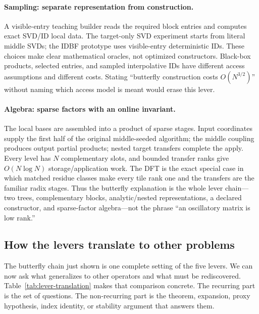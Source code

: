 \documentclass[11pt,a4paper]{article}
\begin{document}
\paragraph{Sampling: separate representation from construction.} A visible-entry teaching builder reads the required block entries and computes exact SVD/ID local data. The target-only SVD experiment starts from literal middle SVDs; the IDBF prototype uses visible-entry deterministic IDs. These choices make clear mathematical oracles, not optimized constructors. Black-box products, selected entries, and sampled interpolative IDs have different access assumptions and different costs. Stating ``butterfly construction costs $O(N^{3/2})$'' without naming which access model is meant would erase this lever.

\paragraph{Algebra: sparse factors with an online invariant.} The local bases are assembled into a product of sparse stages. Input coordinates supply the first half of the original middle-seeded algorithm; the middle coupling produces output partial products; nested target transfers complete the apply. Every level has $N$ complementary slots, and bounded transfer ranks give $O(N\log N)$ storage/application work. The DFT is the exact special case in which matched residue classes make every tile rank one and the transfers are the familiar radix stages. Thus the butterfly explanation is the whole lever chain---two trees, complementary blocks, analytic/nested representations, a declared constructor, and sparse-factor algebra---not the phrase ``an oscillatory matrix is low rank.''

\subsection{How the levers translate to other problems}
\label{sec:lever-problems}
The butterfly chain just shown is one complete setting of the five levers. We can now ask what generalizes to other operators and what must be rediscovered. Table~\ref{tab:lever-translation} makes that comparison concrete. The recurring part is the set of questions. The non-recurring part is the theorem, expansion, proxy hypothesis, index identity, or stability argument that answers them.
\end{document}
